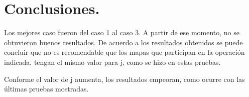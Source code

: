 \documentclass[10pt]{IEEEtran}
\begin{document}
\section{Conclusiones.}

Los mejores caso fueron del caso 1 al caso 3. A partir de ese momento, no se obtuvieron buenos resultados. De acuerdo a los resultados obtenidos se puede concluir que no es recomendable que los mapas que participan en la operación indicada, tengan el mismo valor para j, como se hizo en estas pruebas.

Conforme el valor de j aumenta, los resultados empeoran, como ocurre con las últimas pruebas mostradas.
\end{document}
